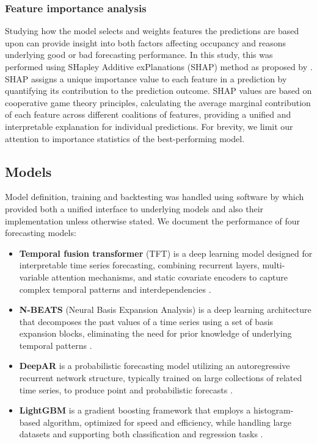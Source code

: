 \subsubsection{Feature importance analysis}

Studying how the model selects and weights features the predictions are based upon can provide insight into both factors affecting occupancy and reasons underlying good or bad forecasting performance. In this study, this was performed using SHapley Additive exPlanations (SHAP) method as proposed by \citet{Lundberg2017}. SHAP assigns a unique importance value to each feature in a prediction by quantifying its contribution to the prediction outcome. SHAP values are based on cooperative game theory principles, calculating the average marginal contribution of each feature across different coalitions of features, providing a unified and interpretable explanation for individual predictions. For brevity, we limit our attention to importance statistics of the best-performing model.

\subsection{Models}
Model definition, training and backtesting was handled using software by \citet{Herzen2022} which provided both a unified interface to underlying models and also their implementation unless otherwise stated. We document the performance of four forecasting models:


\begin{itemize}
	\item \textbf{Temporal fusion transformer} (TFT) is a deep learning model designed for interpretable time series forecasting, combining recurrent layers, multi-variable attention mechanisms, and static covariate encoders to capture complex temporal patterns and interdependencies \cite{Lim2021}.
	\item \textbf{N-BEATS} (Neural Basis Expansion Analysis) is a deep learning architecture that decomposes the past values of a time series using a set of basis expansion blocks, eliminating the need for prior knowledge of underlying temporal patterns \cite{Oreshkin2019}.
	\item \textbf{DeepAR} is a probabilistic forecasting model utilizing an autoregressive recurrent network structure, typically trained on large collections of related time series, to produce point and probabilistic forecasts \cite{Salinas2020}.
	\item \textbf{LightGBM} is a gradient boosting framework that employs a histogram-based algorithm, optimized for speed and efficiency, while handling large datasets and supporting both classification and regression tasks \cite{Ke2017}.
\end{itemize}


